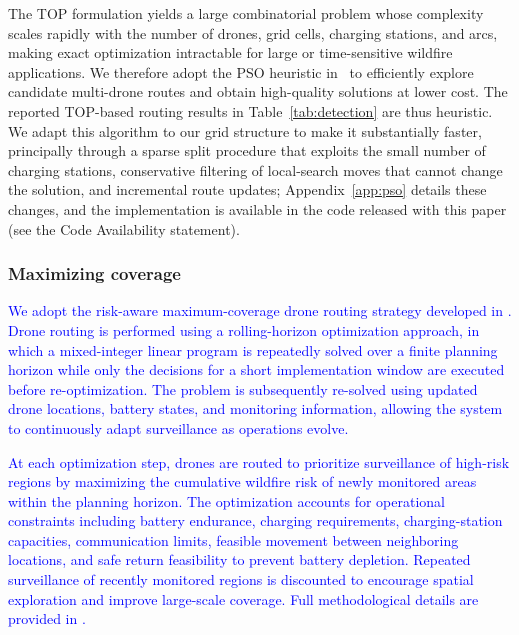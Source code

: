 \documentclass[pdflatex,sn-mathphys-num]{sn-jnl}%
\theoremstyle{thmstyleone}%
\theoremstyle{thmstyletwo}%
\theoremstyle{thmstylethree}%
\newcommand{\blue}[1]{\textcolor{blue}{#1}}
\begin{document}
The TOP formulation yields a large combinatorial problem whose complexity scales rapidly with the number of drones, grid cells, charging stations, and arcs, making exact optimization intractable for large or time-sensitive wildfire applications. We therefore adopt the PSO heuristic in~\cite{PSO} to efficiently explore candidate multi-drone routes and obtain high-quality solutions at lower cost. The reported TOP-based routing results in Table~\ref{tab:detection} are thus heuristic. We adapt this algorithm to our grid structure to make it substantially faster, principally through a sparse split procedure that exploits the small number of charging stations, conservative filtering of local-search moves that cannot change the solution, and incremental route updates; Appendix~\ref{app:pso} details these changes, and the implementation is available in the code released with this paper (see the Code Availability statement).

\subsubsection*{Maximizing coverage}
\blue{We adopt the risk-aware maximum-coverage drone routing strategy developed in \cite{dronebench2025}. Drone routing is performed using a rolling-horizon optimization approach, in which a mixed-integer linear program is repeatedly solved over a finite planning horizon while only the decisions for a short implementation window are executed before re-optimization. The problem is subsequently re-solved using updated drone locations, battery states, and monitoring information, allowing the system to continuously adapt surveillance as operations evolve.}

\blue{At each optimization step, drones are routed to prioritize surveillance of high-risk regions by maximizing the cumulative wildfire risk of newly monitored areas within the planning horizon. The optimization accounts for operational constraints including battery endurance, charging requirements, charging-station capacities, communication limits, feasible movement between neighboring locations, and safe return feasibility to prevent battery depletion. Repeated surveillance of recently monitored regions is discounted to encourage spatial exploration and improve large-scale coverage. Full methodological details are provided in \cite{dronebench2025}.}



\end{document}
